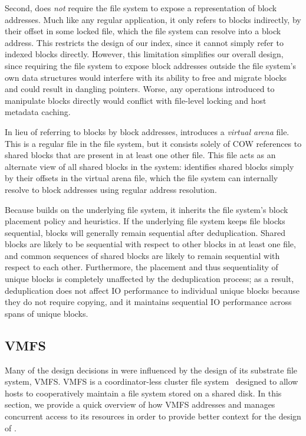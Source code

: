 Second, \DeDe does \emph{not} require the file system to expose a
representation of block addresses.  Much like any regular application,
it only refers to blocks indirectly, by their offset in some
locked file, which the file system can resolve into a block
address.  This restricts the design of our index, since it cannot
simply refer to indexed blocks directly.  However, this limitation
simplifies our overall design, since requiring the file system to expose block
addresses outside the file system's own data structures would
interfere with its ability to free and migrate blocks and could result
in dangling pointers.  Worse, any operations introduced to manipulate
blocks directly would conflict with file-level locking and host
metadata caching.

In lieu of referring to blocks by block addresses, \DeDe introduces a
\emph{virtual arena} file.  This is a regular file in the file system,
but it consists solely of COW references to shared blocks that are
present in at least one other file.  This file acts as an alternate
view of all shared blocks in the system: \DeDe identifies shared
blocks simply by their offsets in the virtual arena file, which the
file system can internally resolve to block addresses using regular
address resolution.

Because \DeDe builds on the underlying file system, it inherits the
file system's block placement policy and heuristics.  If the
underlying file system
keeps file blocks sequential, blocks will generally remain sequential
after deduplication.  Shared blocks are likely to be sequential with
respect to other blocks in at least one file, and common sequences of
shared blocks are likely to remain sequential with respect to each
other.  Furthermore, the placement and thus sequentiality of unique
blocks is completely unaffected by the deduplication process; as a
result,
%
%
deduplication does not affect IO performance to individual unique
blocks because they do not require copying, and it maintains
sequential IO performance across spans of unique blocks.

\subsection{VMFS}
\label{sec:vmfs}

Many of the design decisions in \DeDe were influenced by the design of
its substrate file system, VMFS.  VMFS is a coordinator-less cluster
file system~\cite{vmfsdatasheet} designed to allow hosts to
cooperatively maintain a file system stored on a shared disk. In this
section, we provide a quick overview of how VMFS addresses and
manages concurrent access to its resources in order to provide better
context for the design of \DeDe.

